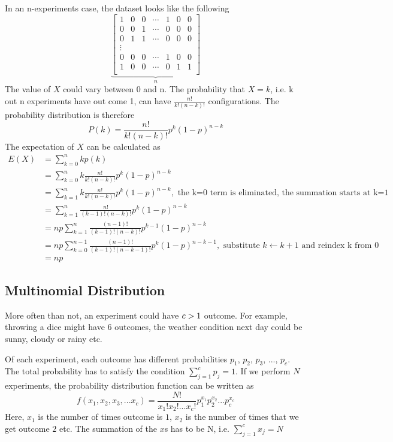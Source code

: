 \documentclass[12pt, oneside]{article}
\begin{document}
In an n-experiments case, the dataset looks like the following
\[
\underbrace{
\begin{bmatrix}
    1 & 0  &0 &\cdots &1 & 0  &0  \\
    0 & 0  &1 &\cdots &0 & 0  &0 \\
    0 & 1  &1 &\cdots &0 & 0  &0 \\
    \vdots \\
    0 &0  &0 &\cdots &1& 0  &0\\
    1 & 0  &0 &\cdots &0 & 1 &1\\
\end{bmatrix}
}_{n}
\]
The value of $X$ could vary between 0 and n. The probability that $X=k$, i.e. k out n experiments have out come 1, can have $\frac{n!}{k!(n-k)!}$ configurations. The probability distribution is therefore
$$P(k)=\frac{n!}{k!(n-k)!}p^k(1-p)^{n-k}$$
The expectation of $X$ can be calculated as
\begin{align*}
E(X)&=\sum\limits_{k=0}^{n}kp(k)\\
&=\sum\limits_{k=0}^{n}k\frac{n!}{k!(n-k)!}p^k(1-p)^{n-k}\\ 
&=\sum\limits_{k=1}^{n}k\frac{n!}{k!(n-k)!}p^{k}(1-p)^{n-k}, \text{ the k=0 term is eliminated, the summation starts at k=1}\\
&=\sum\limits_{k=1}^{n}\frac{n!}{(k-1)!(n-k)!}p^{k}(1-p)^{n-k}\\
&=np\sum\limits_{k=1}^{n}\frac{(n-1)!}{(k-1)!(n-k)!}p^{k-1}(1-p)^{n-k}\\
&=np\sum\limits_{k=0}^{n-1}\frac{(n-1)!}{(k-1)!(n-k-1)!}p^{k}(1-p)^{n-k-1}, \text{ substitute }k\leftarrow k+1 \text{ and reindex k from 0}\\
&=np
\end{align*}

\subsection{Multinomial Distribution}
More often than not, an experiment could have $\mathnormal{c}>1$ outcome. For example, throwing a dice might have 6 outcomes, the weather condition next day could be sunny, cloudy or rainy etc. 

Of each experiment, each outcome has different probabilities ${p_1}$, ${p_2}$, ${p_3}$, ..., ${p_c}$. The total probability has to satisfy the condition ${\sum\limits_{j=1}^c p_j=1}$. If we perform $\mathnormal{N}$ experiments, the probability distribution function can be written as 
$${f(x_1, x_2, x_3, ... x_c)=\frac{N!}{x_1! x_2! ... x_c!} p_1^{x_1} p_2^{x_2} ... p_c^{x_c}}$$
Here, $x_1$ is the number of times outcome is $1$, $x_2$ is the number of times that we get outcome $2$ etc. The summation of the $x$s has to be N, i.e. $\sum\limits_{j=1}^{c}x_j=N$
\end{document}
